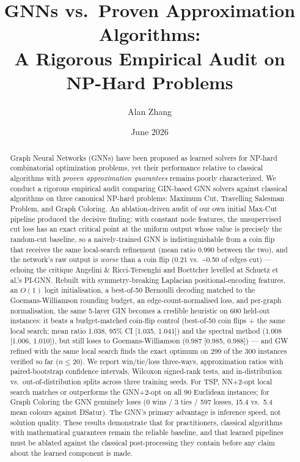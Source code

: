 \documentclass[11pt]{article}
\title{GNNs vs.\ Proven Approximation Algorithms:\\A Rigorous Empirical Audit on NP-Hard Problems}
\author{Alan Zhang}
\date{June 2026}
\begin{document}
\maketitle

\begin{abstract}
Graph Neural Networks (GNNs) have been proposed as learned solvers for NP-hard combinatorial optimization problems, yet their performance relative to classical algorithms with \emph{proven approximation guarantees} remains poorly characterized.
We conduct a rigorous empirical audit comparing GIN-based GNN solvers against classical algorithms on three canonical NP-hard problems: Maximum Cut, Travelling Salesman Problem, and Graph Coloring.
An ablation-driven audit of our own initial Max-Cut pipeline produced the decisive finding: with constant node features, the unsupervised cut loss has an exact critical point at the uniform output whose value is precisely the random-cut baseline, so a naively-trained GNN is indistinguishable from a coin flip that receives the same local-search refinement (mean ratio 0.990 between the two), and the network's raw output is \emph{worse} than a coin flip (0.21 vs.\ \textasciitilde0.50 of edges cut) --- echoing the critique Angelini \& Ricci-Tersenghi and Boettcher levelled at Schuetz et al.'s PI-GNN.
Rebuilt with symmetry-breaking Laplacian positional-encoding features, an $O(1)$ logit initialisation, a best-of-50 Bernoulli decoding matched to the Goemans-Williamson rounding budget, an edge-count-normalised loss, and per-graph normalisation, the same 5-layer GIN becomes a credible heuristic on 600 held-out instances: it beats a budget-matched coin-flip control (best-of-50 coin flips + the same local search; mean ratio 1.038, 95\% CI [1.035, 1.041]) and the spectral method (1.008 [1.006, 1.010]), but still loses to Goemans-Williamson (0.987 [0.985, 0.988]) --- and GW refined with the same local search finds the exact optimum on 299 of the 300 instances verified so far ($n \leq 20$).
We report win/tie/loss three-ways, approximation ratios with paired-bootstrap confidence intervals, Wilcoxon signed-rank tests, and in-distribution vs.\ out-of-distribution splits across three training seeds.
For TSP, NN+2-opt local search matches or outperforms the GNN+2-opt on all 90 Euclidean instances; for Graph Coloring the GNN genuinely loses (0 wins / 3 ties / 597 losses, 15.4 vs.\ 5.4 mean colours against DSatur).
The GNN's primary advantage is inference speed, not solution quality.
These results demonstrate that for practitioners, classical algorithms with mathematical guarantees remain the reliable baseline, and that learned pipelines must be ablated against the classical post-processing they contain before any claim about the learned component is made.
\end{abstract}
\end{document}
